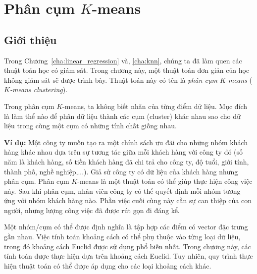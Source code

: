 \chapter{Phân cụm $K$-means}
\label{cha:kmeans}
\section{Giới thiệu}
Trong Chương~\ref{cha:linear_regression} và, \ref{cha:knn}, chúng ta đã làm quen
các thuật toán học có giám sát. Trong chương này, một thuật toán đơn giản của
học không giám sát sẽ được trình bày. Thuật toán này có tên là \textit{phân cụm
$K$-means} (\textit{$K$-means clustering}).

Trong phân cụm $K$-means, ta không biết nhãn của từng
điểm dữ liệu. Mục đích là làm thể nào để phân dữ liệu thành các cụm (cluster)
khác nhau sao cho dữ liệu trong cùng một cụm có những tính chất giống nhau.

\textbf{Ví dụ:} Một công ty muốn tạo ra một chính sách ưu đãi cho những nhóm
khách hàng khác nhau dựa trên sự tương tác giữa mỗi khách hàng với công ty đó
(số năm là khách hàng, số tiền khách hàng đã chi trả cho công ty, độ tuổi, giới
tính, thành phố, nghề nghiệp,...). Giả sử công ty có dữ liệu của khách hàng
nhưng phân cụm. Phân cụm $K$-means là một thuật toán có thể giúp thực hiện
công việc này. Sau khi phân cụm, nhân viên công ty có thể quyết định mỗi
nhóm tương ứng với nhóm khách hàng nào. Phần việc cuối cùng này cần sự can thiệp
của con người, nhưng lượng công việc đã được rút gọn đi đáng kể.


Một nhóm/cụm có thể được định nghĩa là tập hợp các điểm có
vector đặc trưng gần nhau. Việc tính toán khoảng cách có thể phụ thuộc vào từng loại dữ liệu, trong đó khoảng cách Euclid được sử dụng phổ biến nhất. Trong chương này, các tính toán được thực hiện dựa trên khoảng cách Euclid. Tuy nhiên, quy trình thực hiện thuật toán có thể được áp dụng cho các loại khoảng cách khác.

